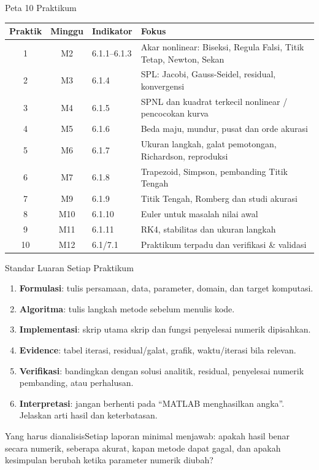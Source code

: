 \documentclass[slides,english,noindex,lean,nobackpage,nocopyright,noupdate,nosummary]{enacom}
\newcommand{\AnalysisBox}[1]{\begin{alertblock}{Yang harus dianalisis}#1\end{alertblock}}
\newcommand{\meth}[1]{\textbf{#1}}
\begin{document}
\begin{frame}{Peta 10 Praktikum}
\scriptsize
\begin{tabularx}{\textwidth}{c c p{} X}
\hline
\textbf{Praktik} & \textbf{Minggu} & \textbf{Indikator} & \textbf{Fokus}\\\hline
1&M2&6.1.1--6.1.3&Akar nonlinear: Biseksi, Regula Falsi, Titik Tetap, Newton, Sekan\\
2&M3&6.1.4&SPL: Jacobi, Gauss-Seidel, residual, konvergensi\\
3&M4&6.1.5&SPNL dan kuadrat terkecil nonlinear / pencocokan kurva\\
4&M5&6.1.6&Beda maju, mundur, pusat dan orde akurasi\\
5&M6&6.1.7&Ukuran langkah, galat pemotongan, Richardson, reproduksi\\
6&M7&6.1.8&Trapezoid, Simpson, pembanding Titik Tengah\\
7&M9&6.1.9&Titik Tengah, Romberg dan studi akurasi\\
8&M10&6.1.10&Euler untuk masalah nilai awal\\
9&M11&6.1.11&RK4, stabilitas dan ukuran langkah\\
10&M12&6.1/7.1&Praktikum terpadu dan verifikasi \& validasi\\\hline
\end{tabularx}
\end{frame}

\begin{frame}{Standar Luaran Setiap Praktikum}
\begin{enumerate}
\item \meth{Formulasi}: tulis persamaan, data, parameter, domain, dan target komputasi.
\item \meth{Algoritma}: tulis langkah metode sebelum menulis kode.
\item \meth{Implementasi}: skrip utama skrip dan fungsi penyelesai numerik dipisahkan.
\item \meth{Evidence}: tabel iterasi, residual/galat, grafik, waktu/iterasi bila relevan.
\item \meth{Verifikasi}: bandingkan dengan solusi analitik, residual, penyelesai numerik pembanding, atau perhalusan.
\item \meth{Interpretasi}: jangan berhenti pada ``MATLAB menghasilkan angka''. Jelaskan arti hasil dan keterbatasan.
\end{enumerate}
\vfill
\AnalysisBox{Setiap laporan minimal menjawab: apakah hasil benar secara numerik, seberapa akurat, kapan metode dapat gagal, dan apakah kesimpulan berubah ketika parameter numerik diubah?}
\end{frame}
\end{document}
